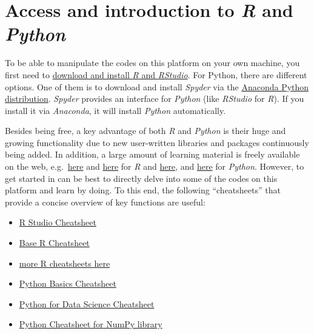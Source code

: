 \documentclass[
  letterpaper,
  DIV=11,
  numbers=noendperiod]{scrreprt}
\begin{document}
\section{\texorpdfstring{Access and introduction to \emph{R} and
\emph{Python}}{Access and introduction to R and Python}}\label{access-and-introduction-to-r-and-python}

To be able to manipulate the codes on this platform on your own machine,
you first need to
\href{https://rstudio-education.github.io/hopr/starting.html}{download
and install \emph{R} and \emph{RStudio}}. For Python, there are
different options. One of them is to download and install \emph{Spyder}
via the \href{https://www.anaconda.com/download}{Anaconda Python
distribution}. \emph{Spyder} provides an interface for \emph{Python}
(like \emph{RStudio} for \emph{R}). If you install it via
\emph{Anaconda}, it will install \emph{Python} automatically.

Besides being free, a key advantage of both \emph{R} and \emph{Python}
is their huge and growing functionality due to new user-written
libraries and packages continuously being added. In addition, a large
amount of learning material is freely available on the web,
e.g.~\href{https://education.rstudio.com/learn/beginner/}{here} and
\href{https://www.w3schools.com/r/default.asp}{here} for \emph{R} and
\href{https://www.python.org/about/gettingstarted/}{here}, and
\href{https://www.w3schools.com/python/python_intro.asp}{here} for
\emph{Python}. However, to get started in can be best to directly delve
into some of the codes on this platform and learn by doing. To this end,
the following ``cheatsheets'' that provide a concise overview of key
functions are useful:

\begin{itemize}
\item
  \href{https://posit.co/wp-content/uploads/2022/10/rstudio-ide-1.pdf}{R
  Studio Cheatsheet}
\item
  \href{https://iqss.github.io/dss-workshops/R/Rintro/base-r-cheat-sheet.pdf}{Base
  R Cheatsheet}
\item
  \href{https://posit.co/resources/cheatsheets/}{more R cheatsheets
  here}
\item
  \href{https://res.cloudinary.com/dyd911kmh/image/upload/v1694526244/Marketing/Blog/Python_Basics_Cheat_Sheet-updated.pdf}{Python
  Basics Cheatsheet}
\item
  \href{https://s3.amazonaws.com/assets.datacamp.com/blog_assets/PythonForDataScience.pdf}{Python
  for Data Science Cheatsheet}
\item
  \href{https://assets.datacamp.com/blog_assets/Numpy_Python_Cheat_Sheet.pdf}{Python
  Cheatsheet for NumPy library}
\end{itemize}
\end{document}
